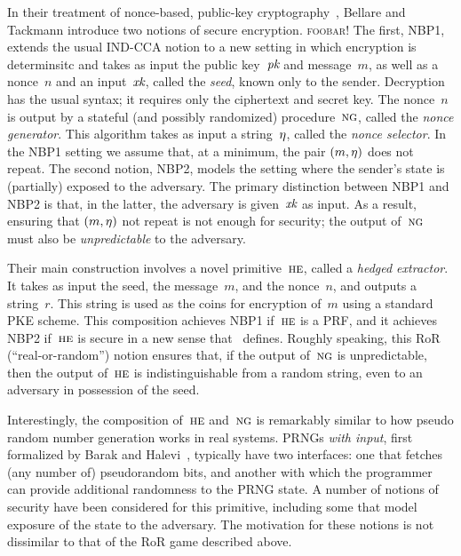 %
%
%
\renewcommand{\ng}{\schemefont{ng}}
\newcommand{\he}{\schemefont{he}}
\newcommand{\foobar}{\textsc{foobar}}
In their treatment of nonce-based, public-key
cryptography~\cite{bellare2016nonce}, Bellare and Tackmann introduce two notions
of secure encryption. \foobar!
%
The first, NBP1, extends the usual IND-CCA notion to a new setting in which
encryption is determinsitc and takes as input the public key~$\textit{pk}$ and
message~$m$, as well as a nonce~$n$ and an input~$\textit{xk}$, called the \emph{seed},
known only to the sender. Decryption has the usual syntax; it requires only the
ciphertext and secret key. The nonce~$n$ is output by a stateful (and possibly
randomized) procedure~$\ng$, called the \emph{nonce generator}. This algorithm
takes as input a string~$\eta$, called the \emph{nonce selector}. In the NBP1
setting we assume that, at a minimum, the pair $(m, \eta)$ does not repeat.
%
The second notion, NBP2, models the setting where the sender's state is
(partially) exposed to the adversary. The primary distinction between NBP1 and
NBP2 is that, in the latter, the adversary is given~$\textit{xk}$ as input. As a result,
ensuring that $(m, \eta)$ not repeat is not enough for security; the output
of~$\ng$ must also be \emph{unpredictable} to the adversary.

Their main construction involves a novel primitive~$\he$, called a \emph{hedged
extractor}. It takes as input the seed, the message~$m$, and the nonce~$n$, and
outputs a string~$r$. This string is used as the coins for encryption of~$m$
using a standard PKE scheme. This composition achieves NBP1 if~$\he$ is a PRF,
and it achieves NBP2 if~$\he$ is secure in a new sense
that~\cite{bellare2016nonce} defines.
%
Roughly speaking, this RoR (``real-or-random'') notion ensures that, if the
output of~$\ng$ is unpredictable, then the output of~$\he$ is indistinguishable
from a random string, even to an adversary in possession of the seed.

Interestingly, the composition of~$\he$ and~$\ng$ is remarkably similar to how
pseudo random number generation works in real systems. PRNGs \emph{with input},
first formalized by Barak and Halevi~\cite{barak2005model}, typically have two
interfaces: one that fetches (any number of) pseudorandom bits, and another with
which the programmer can provide additional randomness to the PRNG state. A number
of notions of security have been considered for this primitive, including some
that model exposure of the state to the adversary. The motivation for these
notions is not dissimilar to that of the RoR game described above.

